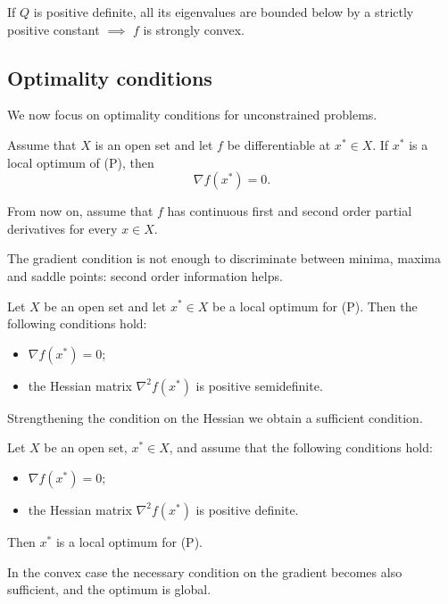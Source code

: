 If $Q$ is positive definite, all its eigenvalues are bounded below by a strictly positive constant $\implies$ $f$ is strongly convex.

\subsection{Optimality conditions}
We now focus on optimality conditions for unconstrained problems.

\begin{theorem}
    Assume that $X$ is an open set and let $f$ be differentiable at $x^* \in X$. If $x^*$ is a local optimum of (P), then
    \[
        \nabla f(x^*)=0.
    \]
\end{theorem}

From now on, assume that $f$ has continuous first and second order partial derivatives for every $x \in X$.

The gradient condition is not enough to discriminate between minima, maxima and saddle points: second order information helps.

\begin{theorem}
    Let $X$ be an open set and let $x^* \in X$ be a local optimum for (P). Then the following conditions hold:
    \begin{itemize}
        \item $\nabla f(x^*)=0$;
        \item the Hessian matrix $\nabla^2 f(x^*)$ is positive semidefinite.
    \end{itemize}
\end{theorem}

Strengthening the condition on the Hessian we obtain a sufficient condition.

\begin{theorem}
    Let $X$ be an open set, $x^* \in X$, and assume that the following conditions hold:
    \begin{itemize}
        \item $\nabla f(x^*)=0$;
        \item the Hessian matrix $\nabla^2 f(x^*)$ is positive definite.
    \end{itemize}
    Then $x^*$ is a local optimum for (P).
\end{theorem}

In the convex case the necessary condition on the gradient becomes also sufficient, and the optimum is global.

